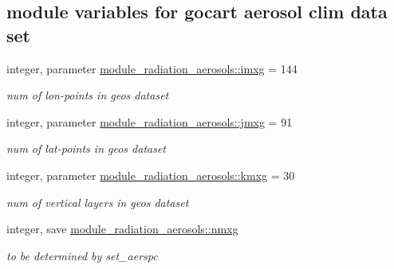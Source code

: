 \subsection*{module variables for gocart aerosol clim data set}
\begin{DoxyCompactItemize}
\item 
\mbox{\label{group__module__radiation__aerosols_gaa7b2e0e1d0669af4efc75cb32301f1f1}} 
integer, parameter \hyperlink{group__module__radiation__aerosols_gaa7b2e0e1d0669af4efc75cb32301f1f1}{module\+\_\+radiation\+\_\+aerosols\+::imxg} = 144
\begin{DoxyCompactList}\small\item\em num of lon-\/points in geos dataset \end{DoxyCompactList}\item 
\mbox{\label{group__module__radiation__aerosols_ga816ee06781e63adf8752a9a67ab2da2d}} 
integer, parameter \hyperlink{group__module__radiation__aerosols_ga816ee06781e63adf8752a9a67ab2da2d}{module\+\_\+radiation\+\_\+aerosols\+::jmxg} = 91
\begin{DoxyCompactList}\small\item\em num of lat-\/points in geos dataset \end{DoxyCompactList}\item 
\mbox{\label{group__module__radiation__aerosols_ga5339e589d92fab8cbb310b84b6ca3d9e}} 
integer, parameter \hyperlink{group__module__radiation__aerosols_ga5339e589d92fab8cbb310b84b6ca3d9e}{module\+\_\+radiation\+\_\+aerosols\+::kmxg} = 30
\begin{DoxyCompactList}\small\item\em num of vertical layers in geos dataset \end{DoxyCompactList}\item 
\mbox{\label{group__module__radiation__aerosols_gadb4c4cdc8e3212777229d1f54e79bb05}} 
integer, save \hyperlink{group__module__radiation__aerosols_gadb4c4cdc8e3212777229d1f54e79bb05}{module\+\_\+radiation\+\_\+aerosols\+::nmxg}
\begin{DoxyCompactList}\small\item\em to be determined by set\+\_\+aerspc \end{DoxyCompactList}\item 

\end{DoxyCompactItemize}
